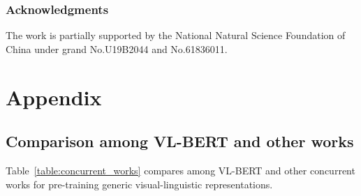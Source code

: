 \documentclass{article} \usepackage{iclr2020_conference,times}
\begin{document}
\subsubsection*{Acknowledgments}
The work is partially supported by the National Natural Science Foundation of China under grand No.U19B2044 and No.61836011.




\clearpage

\appendix
\section{Appendix}

\subsection{Comparison among VL-BERT and other works}

Table~\ref{table:concurrent_works} compares among VL-BERT and other concurrent works for pre-training generic visual-linguistic representations.
\end{document}
